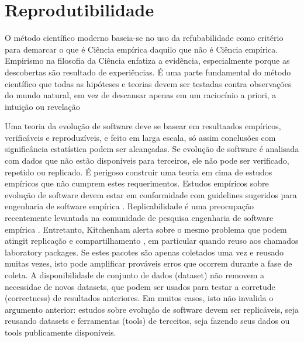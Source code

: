 \section{Reprodutibilidade}


O método científico moderno baseia-se no uso da refubabilidade como critério para
demarcar o que é Ciência empírica daquilo que não é Ciência empírica.
Empirismo na filosofia da Ciência enfatiza a evidência, especialmente porque
as descobertas são resultado de experiências. É uma parte fundamental do método científico
que todas as hipóteses e teorias devem ser testadas contra observações do mundo
natural, em vez de descansar apenas em um raciocínio a priori, a intuição ou
revelação

Uma teoria da evolução de software
deve se basear em resultaados empíricos, verificáveis e reproduzíveis, e feito
em larga escala, só assim conclusões com significância estatística podem ser alcançadas.
Se evolução de software é analisada com dados que não estão disponíveis para terceiros,
ele não pode ser verificado, repetido ou replicado. É perigoso construir uma teoria
em cima de estudos empíricos que não cumprem estes requerimentos.
Estudos empíricos sobre evolução de software devem estar em conformidade com
guidelines sugeridos para engenharia de software empírica
\cite{kitchenham_preliminary_2002, kitchenham_role_2008}.
Replicabilidade é uma preocupação recentemente levantada na comunidade de pesquisa engenharia de software empírica
\cite{gonzalez_reproducibility_2012}.
Entretanto, Kitchenham alerta sobre o mesmo problema que podem atingit replicação e compartilhamento \cite{kitchenham_role_2008},
em particular quando reuso aos chamados laboratory packages.
Se estes pacotes são apenas coletados uma vez e reusado muitas vezes,
isto pode amplificar prováveis erros que ocorrem durante a fase de coleta. A
disponibilidade de conjunto de dados (dataset) não removem a necessidae de novos datasets,
que podem ser usados para testar a corretude (correctness) de resultados anteriores.
Em muitos casos, isto não invalida o argumento anterior: estudos sobre evolução de software
devem ser replicáveis, seja reusando datasets e ferramentas (tools) de terceitos, seja
fazendo seus dados ou tools publicamente disponíveis.
\cite{herraiz_evolution_2013}

